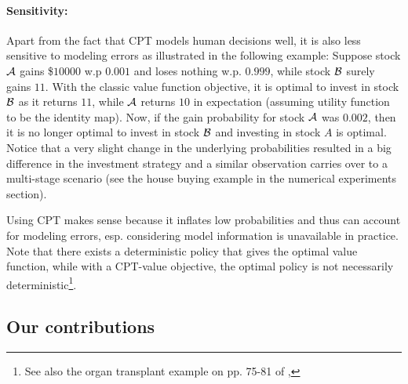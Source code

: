 \documentclass[11pt,letterpaper,english]{article}
\begin{document}
\paragraph{Sensitivity:}
Apart from the fact that CPT models human decisions well, it is also less sensitive to modeling errors as illustrated in the following example: 
Suppose stock $\cal{A}$ gains \$$10000$ w.p $0.001$ and loses nothing w.p. $0.999$, while stock $\cal B$ surely gains $11$. With the classic value function objective, it is optimal to invest in stock $\cal B$ as it returns $11$,  while $\cal A$ returns $10$ in expectation (assuming utility function to be the identity map). Now, if the gain probability for stock $\cal A$ was $0.002$, then it is no longer optimal to invest in stock $\cal B$ and investing in stock $A$ is optimal.
Notice that a very slight change in the underlying probabilities resulted in a big difference in the investment strategy and a similar observation carries over to a multi-stage scenario (see the house buying example in the numerical experiments section). 

Using CPT makes sense because it inflates low probabilities and thus can account for modeling errors, esp. considering model information is unavailable in practice.
Note that there exists a deterministic policy that gives the optimal value function, while with a CPT-value objective, the optimal policy is not necessarily deterministic\footnote{See also the organ transplant example on pp. 75-81 of \cite{lin2013stochastic},}. 


\subsection{Our contributions}
\end{document}
